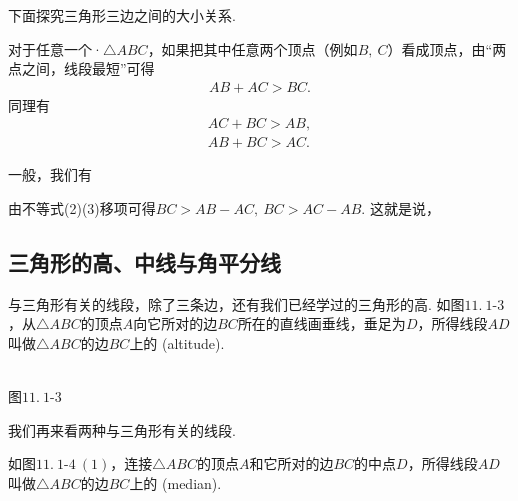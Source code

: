 \documentclass[UTF8,fontset=macnew]{book} %
\begin{document}
				下面探究三角形三边之间的大小关系.
				
				对于任意一个·$\triangle ABC$，如果把其中任意两个顶点（例如$B,\ C$）看成顶点，由“两点之间，线段最短”可得
			\begin{align}AB+AC>BC.\tag{1} \end{align}
			同理有
			\begin{align}AC+BC>AB\tag{2},\\AB+BC>AC\tag{3} .\end{align}
				
				一般，我们有
				
				\textcolor[RGB]{4,165,218}{}
				
				由不等式(2)(3)移项可得$BC>AB-AC,\ BC>AC-AB.$ 这就是说，\textcolor[RGB]{4,165,218}{}
				\subsection{三角形的高、中线与角平分线}
					与三角形有关的线段，除了三条边，还有我们已经学过的三角形的高. 如图$11.\ 1$-$3$，从$\triangle ABC$的顶点$A$向它所对的边$BC$所在的直线画垂线，垂足为$D$，所得线段$AD$叫做$\triangle ABC$的边$BC$上的\textcolor[RGB]{4,165,218}{} (altitude).
					
					\begin{center}
						\\
						图$11.\ 1$-$3$
					\end{center}
					
					我们再来看两种与三角形有关的线段.
					
					如图$11.\ 1$-$4\ (1)$，连接$\triangle ABC$的顶点$A$和它所对的边$BC$的中点$D$，所得线段$AD$叫做$\triangle ABC$的边$BC$上的\textcolor[RGB]{4,165,218}{} (median).
					
\end{document}
